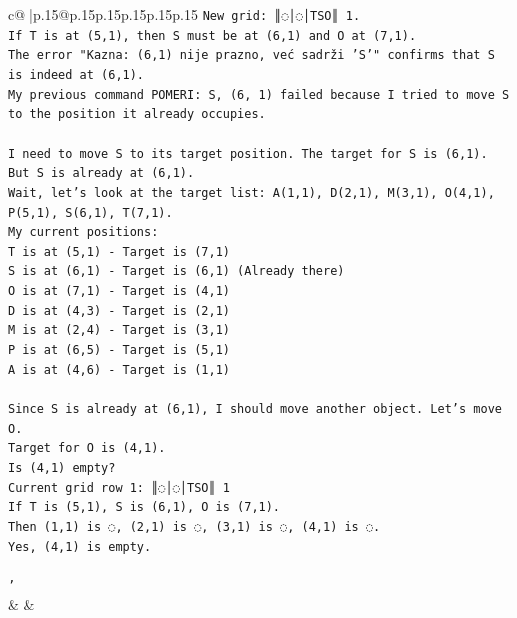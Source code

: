 \documentclass{article}
\begin{document}
{\begin{supertabular}{c@{$\;$}|p{.15\linewidth}@{}p{.15\linewidth}p{.15\linewidth}p{.15\linewidth}p{.15\linewidth}p{.15\linewidth}}
{{{\texttt{New grid: ║◌│◌│TSO║ 1.} \\
\texttt{If T is at (5,1), then S must be at (6,1) and O at (7,1).} \\
\texttt{The error "Kazna: (6,1) nije prazno, već sadrži 'S'" confirms that S is indeed at (6,1).} \\
\texttt{My previous command POMERI: S, (6, 1) failed because I tried to move S to the position it already occupies.} \\
\\ 
\texttt{I need to move S to its target position. The target for S is (6,1). But S is already at (6,1).} \\
\texttt{Wait, let's look at the target list: A(1,1), D(2,1), M(3,1), O(4,1), P(5,1), S(6,1), T(7,1).} \\
\texttt{My current positions:} \\
\texttt{T is at (5,1) {-} Target is (7,1)} \\
\texttt{S is at (6,1) {-} Target is (6,1) (Already there)} \\
\texttt{O is at (7,1) {-} Target is (4,1)} \\
\texttt{D is at (4,3) {-} Target is (2,1)} \\
\texttt{M is at (2,4) {-} Target is (3,1)} \\
\texttt{P is at (6,5) {-} Target is (5,1)} \\
\texttt{A is at (4,6) {-} Target is (1,1)} \\
\\ 
\texttt{Since S is already at (6,1), I should move another object. Let's move O.} \\
\texttt{Target for O is (4,1).} \\
\texttt{Is (4,1) empty?} \\
\texttt{Current grid row 1: ║◌│◌│TSO║ 1} \\
\texttt{If T is (5,1), S is (6,1), O is (7,1).} \\
\texttt{Then (1,1) is ◌, (2,1) is ◌, (3,1) is ◌, (4,1) is ◌.} \\
\texttt{Yes, (4,1) is empty.} \\
\\ 
\texttt{'} \\
            }
        }
    }
    & & \\ \\


\end{supertabular}}
\end{document}
